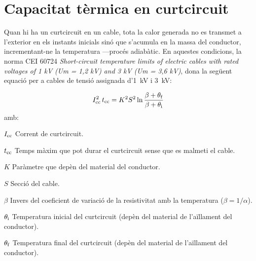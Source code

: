 \section{Capacitat tèrmica en curtcircuit}\label{ces:cables_Icc_termica}

Quan hi ha un curtcircuit en un cable, tota la calor generada no es transmet a l'exterior en els instants inicials sinó que s'acumula en la massa del conductor, incrementant-ne la temperatura ---procés adiabàtic. En aquestes condicions, la norma CEI 60724 \textit{Short-circuit temperature limits of electric cables with rated voltages of 1 kV (Um = 1,2 kV) and 3 kV (Um = 3,6 kV)}, dona la següent equació per a cables de tensió assignada d'\qty{1}{kV} i \qty{3}{kV}:

\begin{equation}
   I_\mathrm{cc}^2 \,t_\mathrm{cc} = K^2 S^2 \ln \frac{\beta + \theta_\mathrm{f}}{\beta + \theta_\mathrm{i}}
\end{equation}
amb:

\begin{list}{}
   {\setlength{\labelwidth}{10mm} \setlength{\leftmargin}{12mm} \setlength{\labelsep}{2mm}}
   \item[\hspace{5mm}$I_\mathrm{cc}$\hfill] Corrent de curtcircuit.
   \item[\hspace{5mm}$t_\mathrm{cc}$\hfill] Temps màxim que pot durar el curtcircuit sense que es malmeti el cable.
   \item[\hspace{5mm}$K$\hfill] Paràmetre que depèn del material del conductor.
   \item[\hspace{5mm}$S$\hfill] Secció del cable.
   \item[\hspace{5mm}$\beta$\hfill] Invers del coeficient de variació de la resistivitat amb la temperatura ($\beta = 1/ \alpha$).
   \item[\hspace{5mm}$\theta_\mathrm{i}$\hfill] Temperatura inicial del curtcircuit (depèn del material de l'aïllament del conductor).
   \item[\hspace{5mm}$\theta_\mathrm{f}$\hfill] Temperatura final del curtcircuit (depèn del material de l'aïllament del conductor).
\end{list}

